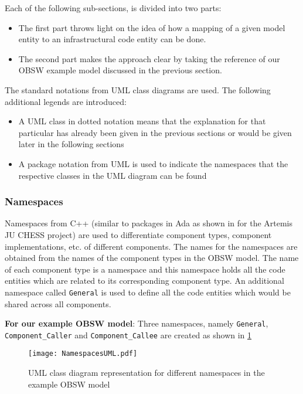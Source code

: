 Each of the following sub-sections, is divided into two parts:
\begin{itemize}
\item The first part throws light on the idea of how a mapping of a given model entity to an infrastructural code entity can be done.
\item The second part makes the approach clear by taking the reference of our OBSW example model discussed in the previous section. 
\end{itemize}

The standard notations from UML class diagrams are used. The following additional legends are introduced:
\begin{itemize}
\item A UML class in dotted notation means that the explanation for that particular has already been given in the previous sections or would be given later in the following sections 
\item A package notation from UML is used to indicate the namespaces that the respective classes in the UML diagram can be found
\end{itemize}  

\subsubsection{\textbf{Namespaces}}
Namespaces from C++ (similar to packages in Ada as shown in \cite{EvoRAVCodeAr} for the Artemis JU CHESS project) are used to differentiate component types, component implementations, etc. of different components. The names for the namespaces are obtained from the names of the component types in the OBSW model. The name of each component type is a namespace and this namespace holds all the code entities which are related to its corresponding component type. An additional namespace called \texttt{General} is used to define all the code entities which would be shared across all components.   

\textbf{For our example OBSW model}: Three namespaces, namely \texttt{General}, \texttt{Component\_Caller} and \texttt{Component\_Callee} are created as shown in \cref{fig: PackagesUML}

\begin{figure}[h]
	\centering
	\texttt{[image: NamespacesUML.pdf]}
	\caption{UML class diagram representation for different namespaces in the example OBSW model}
	\label{fig: PackagesUML}
\end{figure}

